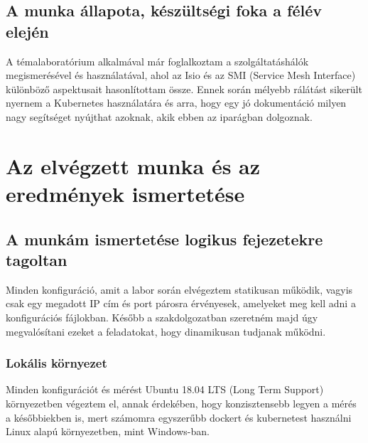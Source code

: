 \documentclass[a4paper,oneside]{article}
\begin{document}


\subsection{A munka állapota, készültségi foka a félév elején}
\label{sec:munka-allap-kesz}
A témalaboratórium alkalmával már foglalkoztam a szolgáltatáshálók
megismerésével és használatával, ahol az Isio és az SMI (Service Mesh
Interface) különböző aspektusait hasonlítottam össze. Ennek során
mélyebb rálátást sikerült nyernem a Kubernetes használatára és arra,
hogy egy jó dokumentáció milyen nagy segítséget nyújthat azoknak,
akik ebben az iparágban dolgoznak.

\newpage
\section{Az elvégzett munka és az eredmények ismertetése}
\label{sec:az-elvegzett-munka}


\subsection{A munkám ismertetése logikus fejezetekre tagoltan}
\label{sec:a-munkam-ismert}
Minden konfiguráció, amit a labor során elvégeztem statikusan működik, vagyis
csak egy megadott IP cím és port párosra érvényesek, amelyeket meg kell adni a
konfigurációs fájlokban. Később a szakdolgozatban szeretném majd úgy
megvalósítani ezeket a feladatokat, hogy dinamikusan tudjanak működni.
\subsubsection{Lokális környezet}
Minden konfigurációt és mérést Ubuntu 18.04 LTS (Long Term Support) környezetben
végeztem el, annak érdekében, hogy konzisztensebb legyen a mérés a későbbiekben is,
mert számomra egyszerűbb dockert és kubernetest használni Linux alapú környezetben,
mint Windows-ban.
\end{document}
